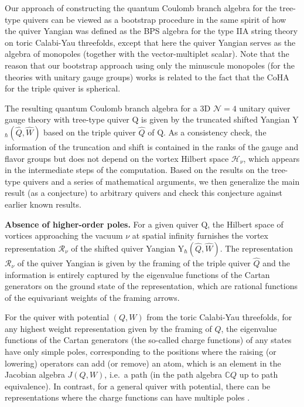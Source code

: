 \documentclass[12pt,a4paper]{article}
\renewcommand{\(}{\left(}
\renewcommand{\)}{\right)}
\renewcommand{\(}{\left(}
\renewcommand{\)}{\right)}
\begin{document}
Our approach of constructing the quantum Coulomb branch algebra for the tree-type quivers can be viewed as a bootstrap procedure in the same spirit of how the quiver Yangian was defined as the BPS algebra for the type IIA string theory on toric Calabi-Yau threefolds, except that here the quiver Yangian serves as the algebra of monopoles (together with the vector-multiplet scalar).
Note that the reason that our bootstrap approach using only the minuscule monopoles (for the theories with unitary gauge groups) works is related to the fact that the CoHA for the triple quiver is spherical. 

The resulting quantum Coulomb branch algebra for a 3D $\mathcal{N}=4$ unitary quiver gauge theory with tree-type quiver $\mathrm{Q}$ is given by the truncated shifted Yangian  Y$_{\hbar}(\widehat{Q},\widehat{W})$ based on the triple quiver $\widehat{Q}$ of $\mathrm{Q}$. 
As a consistency check, 
the information of the truncation and shift is contained in the ranks of the gauge and flavor groups but does not depend on the vortex Hilbert space $\mathcal{H}_{\nu}$, which appears in the intermediate steps of the computation.
Based on the results on the tree-type quivers and a series of mathematical arguments, we then generalize the main result (as a conjecture) to arbitrary quivers and check this conjecture against earlier known results.
 



\medskip

\noindent
\textbf{Absence of higher-order poles.}
For a given quiver $\mathrm{Q}$, the Hilbert space of vortices approaching the vacuum $\nu$ at spatial infinity furnishes the vortex representation $\mathcal{R}_{\nu}$ of the shifted quiver Yangian Y$_{\hbar}(\widehat{Q},\widehat{W})$.
The representation $\mathcal{R}_{\nu}$ of the quiver Yangian is given by the framing of the triple quiver $\widehat{Q}$ and the information is entirely captured by the eigenvalue functions of the Cartan generators on the ground state of the representation, which are rational functions of the equivariant weights of the framing arrows. 

For the quiver with potential $(Q,W)$ from the toric Calabi-Yau threefolds, for any highest weight representation given by the framing of $Q$, the eigenvalue functions of the Cartan generators (the so-called charge functions) of any states have only simple poles, corresponding to the positions where the raising (or lowering) operators can add (or remove) an atom, which is an element in the Jacobian algebra $J(Q,W)$, i.e.\ a path (in the path algebra  $\mathbb{C}Q$ up to path equivalence).
In contrast, for a general quiver with potential, there can be representations where the charge functions can have multiple poles \cite{Li:2023zub}.
\end{document}

